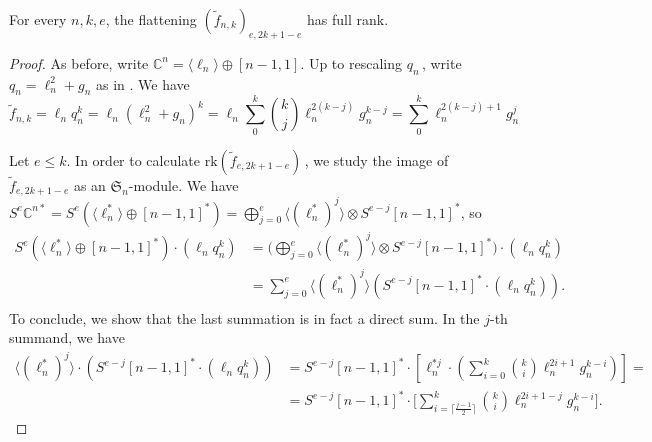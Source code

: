 \documentclass{toc}
\newcommand{\textsum}{{\textstyle \sum}}
\newcommand{\textbinom}[2]{{\textstyle \binom{#1}{#2}}}
\newcommand{\bbC}{\mathbb{C}}
\newcommand{\frakS}{\mathfrak{S}}
\renewcommand{\tilde}[1]{\widetilde{#1}}
\newcommand{\rk}{\mathrm{rk}}
\begin{document}
\begin{theorem}\label{thm: flattenings of ellqk hit everything}
 For every $n,k,e$, the flattening $(\tilde f_{n,k})_{e,2k+1-e}$ has full rank.
\end{theorem}
\begin{proof}
 

As before, write $\bbC^n = \langle \ell_n \rangle \oplus [n-1,1]$. Up to rescaling $q_n$\,, write $q_n = \ell_n^2 + g_n$ as in . We have 
\[
 \tilde{f}_{n,k} = \ell_n q_n^k = \ell_n (\ell_n^2 + g_n)^k = \ell_n \textsum_0^k \textbinom{k}{j}\ell_n^{2(k-j)} g_n^{k-j} = \textsum_0^k \ell_n^{2(k-j)+1} g_n^{j} 
\]
 

Let $e \leq k$. In order to calculate $\rk (\tilde{f}_{e,2k+1-e})$\,, we study the image of $\tilde{f}_{e,2k+1-e}$ as an $\frakS_n$-module. We have $S^e \bbC^{n*} = S^e ( \langle \ell_n^* \rangle \oplus [n-1,1]^* )  =   \bigoplus_{j = 0}^e \langle (\ell_n^*)^j \rangle \otimes S^{e-j} [n-1,1]^* $, so   
\begin{equation}\label{eqn: decomposition of image of ellqk}
\begin{aligned}
 S^e ( \langle \ell_n^* \rangle \oplus [n-1,1]^* ) \cdot (\ell_n q_n^k) &= \biggl( \bigoplus_{j = 0}^e \langle (\ell_n^*)^j \rangle \otimes  S^{e-j} [n-1,1]^* \biggr) \cdot (\ell_n q_n^k)  \\
&= \sum_{j = 0}^e \langle (\ell_n^*)^j\rangle   (S^{e-j} [n-1,1]^* \cdot (\ell_n q_n^k)).  \\
%
\end{aligned}
\end{equation}
To conclude, we show that the last summation is in fact a direct sum. In the $j$-th summand, we have 
\begin{equation}\label{eqn: summation in thm ell q}
\begin{aligned}
\langle (\ell_n^*)^j\rangle   \cdot (S^{e-j} [n-1,1]^* \cdot (\ell_n q_n^k)) &=  S^{e-j} [n-1,1]^* \cdot \left[ \ell_n^{*j} \cdot  \left( \textsum_{i=0}^k \textbinom{k}{i} \ell_n^{2i+1} g_n^{k-i}\right)\right] =  \\ 
&= S^{e-j} [n-1,1]^* \cdot  \biggl[ \sum_{i=\lceil \frac{j-1}{2}\rceil}^k \textbinom{k}{i} \ell_n^{2i+1 - j} g_n^{k-i}\biggr].
\end{aligned}
\end{equation}


\end{proof}
\end{document}
